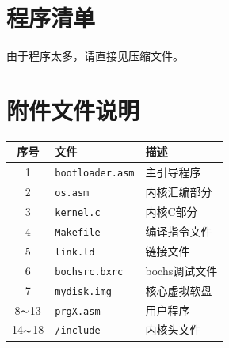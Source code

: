 \documentclass[logo,reportComp]{thesis}
\begin{document}
\appendix
\appendixconfig
\section{程序清单}
\label{sec:code}
由于程序太多，请直接见压缩文件。

\section{附件文件说明}
\begin{center}
\begin{tabular}{|c|l|l|}\hline
序号 & 文件 & 描述 \\\hline
1 & \verb'bootloader.asm' & 主引导程序\\\hline
2 & \verb'os.asm' & 内核汇编部分\\\hline
3 & \verb'kernel.c' & 内核C部分\\\hline
4 & \verb'Makefile' & 编译指令文件\\\hline
5 & \verb'link.ld' & 链接文件\\\hline
6 & \verb'bochsrc.bxrc' & bochs调试文件\\\hline
7 & \verb'mydisk.img' & 核心虚拟软盘\\\hline
8$\thicksim$13 & \verb'prgX.asm' & 用户程序\\\hline
14$\thicksim$18 & \verb'/include' & 内核头文件\\\hline
\end{tabular}
\end{center}
\end{document}
